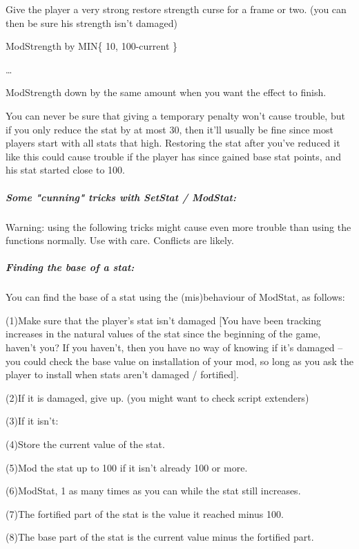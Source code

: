 Give the player a very strong restore strength curse for a frame or two.
(you can then be sure his strength isn't damaged)

ModStrength by MIN\{ 10, 100-current \}

\ldots{}

ModStrength down by the same amount when you want the effect to finish.

You can never be sure that giving a temporary penalty won't cause
trouble, but if you only reduce the stat by at most 30, then it'll
usually be fine since most players start with all stats that high.
Restoring the stat after you've reduced it like this could cause trouble
if the player has since gained base stat points, and his stat started
close to 100.

\hypertarget{some-cunning-tricks-with-setstat-modstat}{%
\subparagraph{\texorpdfstring{\hfill\break
Some "cunning" tricks with SetStat /
ModStat:}{ Some "cunning" tricks with SetStat / ModStat:}}\label{some-cunning-tricks-with-setstat-modstat}}

Warning: using the following tricks might cause even more trouble than
using the functions normally. Use with care. Conflicts are likely.

\hypertarget{finding-the-base-of-a-stat}{%
\subparagraph{Finding the base of a
stat:}\label{finding-the-base-of-a-stat}}

You can find the base of a stat using the (mis)behaviour of ModStat, as
follows:

(1)Make sure that the player's stat isn't damaged {[}You have been
tracking increases in the natural values of the stat since the beginning
of the game, haven't you? If you haven't, then you have no way of
knowing if it's damaged -- you could check the base value on
installation of your mod, so long as you ask the player to install when
stats aren't damaged / fortified{]}.

(2)If it is damaged, give up. (you might want to check script extenders)

(3)If it isn't:

(4)Store the current value of the stat.

(5)Mod the stat up to 100 if it isn't already 100 or more.

(6)ModStat, 1 as many times as you can while the stat still increases.

(7)The fortified part of the stat is the value it reached minus 100.

(8)The base part of the stat is the current value minus the fortified
part.

